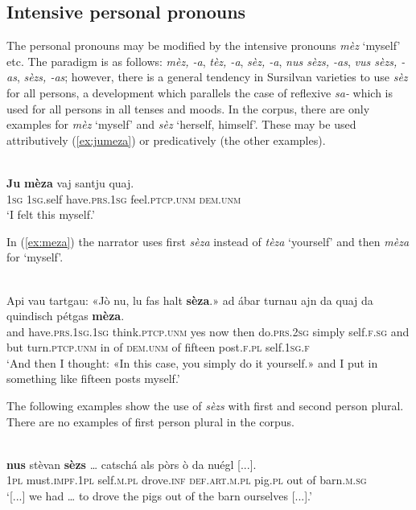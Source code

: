 \subsection {Intensive personal pronouns}
The personal pronouns may be modified by the intensive pronouns \textit{mèz} `myself' etc. The paradigm is as follows: \textit{mèz, -a}, \textit{tèz, -a}, \textit{sèz, -a}, \textit{nus sèzs, -as}, \textit{vus sèzs, -as}, \textit{sèzs, -as}; however, there is a general tendency in Sursilvan varieties to use \textit{sèz} for all persons, a development which parallels the case of reflexive \textit{sa-} which is used for all persons in all tenses and moods. In the corpus, there are only examples for \textit{mèz} `myself' and \textit{sèz} `herself, himself'. These may be used attributively (\ref{ex:jumeza}) or predicatively (the other examples).

\ea
\label{ex:jumeza}
\\
\gll \textbf{Ju} \textbf{mèza} vaj santju quaj.\\
\textsc{1sg} \textsc{1sg}.self have.\textsc{prs.1sg} feel.\textsc{ptcp.unm} \textsc{dem.unm}\\
\glt`I felt this myself.'
\z

In (\ref{ex:meza}) the narrator uses first \textit{sèza} instead of \textit{tèza} `yourself' and then \textit{mèza} for `myself'.

\ea
\label{ex:meza}
\\
\gll  Api vau tartgau: «Jò nu, lu fas halt \textbf{sèza}.» ad ábar turnau ajn da quaj da quindisch pétgas \textbf{mèza}.\\
and have.\textsc{prs.1sg.1sg} think.\textsc{ptcp.unm} yes now then do.\textsc{prs.2sg} simply self.\textsc{f.sg} and but turn.\textsc{ptcp.unm} in of \textsc{dem.unm} of fifteen post.\textsc{f.pl} self.\textsc{1sg.f} \\
\glt `And then I thought: «In this case, you simply do it yourself.» and I put in something like fifteen posts myself.'
\z

The following examples show the use of \textit{sèzs} with first and second person plural. There are no examples of first person plural in the corpus.

\ea
\label{ex:sezs1pl}
\\
\gll    [...] \textbf{nus} stèvan \textbf{sèzs} … catschá als pòrs ò da nuégl [...].\\
{} \textsc{1pl} must.\textsc{impf.1pl} self.\textsc{m.pl} {}  drove.\textsc{inf} \textsc{def.art.m.pl} pig.\textsc{pl} out of barn.\textsc{m.sg}\\
\glt `[...] we had … to drove the pigs out of the barn ourselves [...].'
\z

